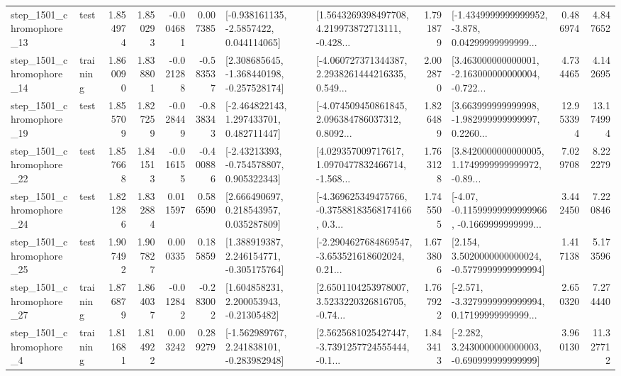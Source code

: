 \begin{tabular}{llrrrrllrlrr}
 step\_1501\_chromophore\_13 &      test &      1.854974 &    1.850293 &     -0.004681 &  0.007385 &     [-0.938161135, -2.5857422, 0.044114065] &  [1.5643269398497708, 4.219973872713111, -0.428... &       1.791879 &  [-1.4349999999999952, -3.878, 0.04299999999999... &            0.486974 &          4.847652 \\
 step\_1501\_chromophore\_14 &  training &      1.860090 &    1.838801 &     -0.021288 & -0.583537 &   [2.308685645, -1.368440198, -0.257528174] &  [-4.060727371344387, 2.2938261444216335, 0.549... &       2.002870 &  [3.463000000000001, -2.163000000000004, -0.722... &            4.734465 &          4.142695 \\
 step\_1501\_chromophore\_19 &      test &      1.855709 &    1.827259 &     -0.028449 & -0.838343 &    [-2.464822143, 1.297433701, 0.482711447] &  [-4.074509450861845, 2.096384786037312, 0.8092... &       1.826489 &  [3.663999999999998, -1.982999999999997, 0.2260... &           12.953394 &         13.174994 \\
 step\_1501\_chromophore\_22 &      test &      1.857668 &    1.841513 &     -0.016155 & -0.400886 &    [-2.43213393, -0.754578807, 0.905322343] &  [4.029357009717617, 1.0970477832466714, -1.568... &       1.763128 &  [3.8420000000000005, 1.1749999999999972, -0.89... &            7.029708 &          8.222279 \\
 step\_1501\_chromophore\_24 &      test &      1.821286 &    1.832884 &      0.011597 &  0.586590 &     [2.666490697, 0.218543957, 0.035287809] &  [-4.369625349475766, -0.37588183568174166, 0.3... &       1.745505 &  [-4.07, -0.11599999999999966, -0.1669999999999... &            3.442450 &          7.220846 \\
 step\_1501\_chromophore\_25 &      test &      1.907492 &    1.907827 &      0.000335 &  0.185859 &    [1.388919387, 2.246154771, -0.305175764] &  [-2.2904627684869547, -3.653521618602024, 0.21... &       1.673806 &   [2.154, 3.5020000000000024, -0.5779999999999994] &            1.417138 &          5.173596 \\
 step\_1501\_chromophore\_27 &  training &      1.876879 &    1.864037 &     -0.012842 & -0.283002 &     [1.604858231, 2.200053943, -0.21305482] &  [2.6501104253978007, 3.5233220326816705, -0.74... &       1.767922 &  [-2.571, -3.3279999999999994, 0.17199999999999... &            2.650320 &          7.274440 \\
  step\_1501\_chromophore\_4 &  training &      1.811681 &    1.814922 &      0.003242 &  0.289279 &   [-1.562989767, 2.241838101, -0.283982948] &  [2.5625681025427447, -3.7391257724555444, -0.1... &       1.843413 &   [-2.282, 3.2430000000000003, -0.690999999999999] &            3.960130 &         11.327712 \\

\end{tabular}
